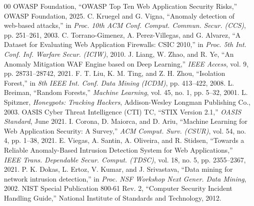 \documentclass[conference]{IEEEtran}
\begin{document}
\begin{thebibliography}{00}
 OWASP Foundation, ``OWASP Top Ten Web Application Security Risks,'' OWASP Foundation, 2025.
 C. Kruegel and G. Vigna, ``Anomaly detection of web-based attacks,'' in \textit{Proc. 10th ACM Conf. Comput. Commun. Secur. (CCS)}, pp. 251--261, 2003.
 C. Torrano-Gimenez, A. Perez-Villegas, and G. Alvarez, ``A Dataset for Evaluating Web Application Firewalls: CSIC 2010,'' in \textit{Proc. 5th Int. Conf. Inf. Warfare Secur. (ICIW)}, 2010.
 J. Liang, W. Zhao, and R. Ye, ``An Anomaly Mitigation WAF Engine based on Deep Learning,'' \textit{IEEE Access}, vol. 9, pp. 28731--28742, 2021.
 F. T. Liu, K. M. Ting, and Z. H. Zhou, ``Isolation Forest,'' in \textit{8th IEEE Int. Conf. Data Mining (ICDM)}, pp. 413--422, 2008.
 L. Breiman, ``Random Forests,'' \textit{Machine Learning}, vol. 45, no. 1, pp. 5--32, 2001.
 L. Spitzner, \textit{Honeypots: Tracking Hackers}, Addison-Wesley Longman Publishing Co., 2003.
 OASIS Cyber Threat Intelligence (CTI) TC, ``STIX Version 2.1,'' \textit{OASIS Standard}, June 2021.
 I. Corona, D. Maiorca, and D. Ariu, ``Machine Learning for Web Application Security: A Survey,'' \textit{ACM Comput. Surv. (CSUR)}, vol. 54, no. 4, pp. 1--38, 2021.
 E. Viegas, A. Santin, A. Oliveira, and R. Stidsen, ``Towards a Reliable Anomaly-Based Intrusion Detection System for Web Applications,'' \textit{IEEE Trans. Dependable Secur. Comput. (TDSC)}, vol. 18, no. 5, pp. 2355--2367, 2021.
 P. K. Dokas, L. Ertoz, V. Kumar, and J. Srivastava, ``Data mining for network intrusion detection,'' in \textit{Proc. NSF Workshop Next Gener. Data Mining}, 2002.
 NIST Special Publication 800-61 Rev. 2, ``Computer Security Incident Handling Guide,'' National Institute of Standards and Technology, 2012.
\end{thebibliography}
\end{document}
